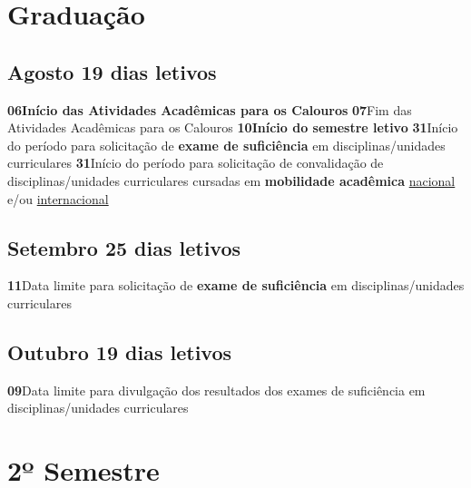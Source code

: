 \documentclass[thesis]{hmcposter}
\begin{document}
\begin{poster}
\section{\color{hmcorange}Graduação}\subsection{Agosto \hfill 19 dias letivos}\textbf{06}\qquad \textbf{Início das Atividades Acadêmicas para os Calouros} \newline \null\textbf{07}\qquad Fim das Atividades Acadêmicas para os Calouros \newline \null\textbf{10}\qquad \textbf{Início do semestre letivo} \newline \null\textbf{31}\qquad Início do período para solicitação de \textbf{exame de suficiência} em disciplinas/unidades curriculares \newline \null\textbf{31}\qquad Início do período para solicitação de convalidação de disciplinas/unidades curriculares cursadas em \textbf{mobilidade acadêmica} \underline{nacional} e/ou \underline{internacional} \newline \null\subsection{Setembro \hfill 25 dias letivos}\textbf{11}\qquad Data limite para solicitação de \textbf{exame de suficiência} em disciplinas/unidades curriculares \newline \null\subsection{Outubro \hfill 19 dias letivos}\textbf{09}\qquad Data limite para divulgação dos resultados dos exames de suficiência em disciplinas/unidades curriculares \newline \null\vfill\null
\columnbreak
\section{\hfill \color{hmcorange}2º Semestre}

\end{poster}
\end{document}

